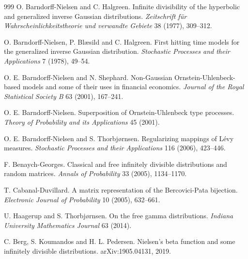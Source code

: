 \begin{thebibliography}{999}
 O. Barndorff-Nielsen and C. Halgreen. Infinite divisibility of the hyperbolic and generalized inverse Gaussian distributions. \emph{Zeitschrift f\"ur Wahrscheinlichkeitstheorie und verwandte Gebiete} 38 (1977), 309--312.

 O. Barndorff-Nielsen, P. Bl{\ae}sild and C. Halgreen. First hitting time models for the generalized inverse Gaussian distribution. \emph{Stochastic Processes and their Applications} 7 (1978), 49--54.

 O. E. Barndorff-Nielsen and N. Shephard. Non-Gaussian Ornstein-Uhlenbeck-based models and some of their uses in financial economics. \emph{Journal of the Royal Statistical Society B} 63 (2001), 167--241.

 O. E. Barndorff-Nielsen. Superposition of Ornstein-Uhlenbeck type processes. \emph{Theory of Probability and its Applications} 45 (2001).

 O. E. Barndorff-Nielsen and S. Thorbj{\o}rnsen. Regularizing mappings of L\'evy measures. \emph{Stochastic Processes and their Applications} 116 (2006), 423--446.

 F. Benaych-Georges. Classical and free infinitely divisible distributions and random matrices. \emph{Annals of Probability} 33 (2005), 1134--1170.

 T. Cabanal-Duvillard. A matrix representation of the Bercovici-Pata bijection. \emph{Electronic Journal of Probability} 10 (2005), 632--661.

 U. Haagerup and S. Thorbj{\o}rnsen. On the free gamma distributions. \emph{Indiana University Mathematics Journal} 63 (2014).

 C. Berg, S. Koumandos and H. L. Pedersen. Nielsen's beta function and some infinitely divisible distributions. arXiv:1905.04131, 2019.


\end{thebibliography}
